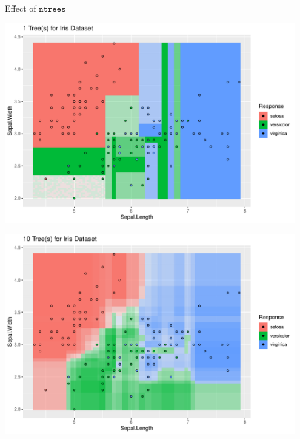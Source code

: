 \documentclass[11pt,compress,t,notes=noshow, xcolor=table]{beamer}
\begin{document}
\begin{vbframe}{Effect of $\texttt{ntrees}$}
\begin{knitrout}\scriptsize
{}\color{fgcolor}

{\centering \includegraphics[width=0.95\textwidth]{figure/cart_forest_intro_1} 

}

\end{knitrout}
\begin{knitrout}\scriptsize
{}\color{fgcolor}

{\centering \includegraphics[width=0.95\textwidth]{figure/cart_forest_intro_2} 

}
\end{knitrout}
\begin{knitrout}\scriptsize
{}\color{fgcolor}


\end{knitrout}
\end{vbframe}
\end{document}
